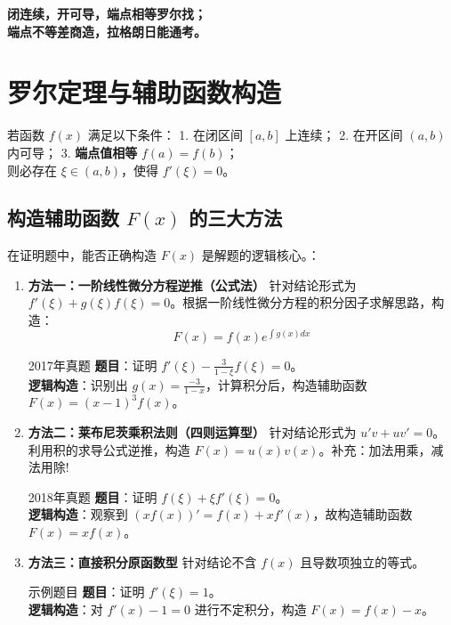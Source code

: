 \documentclass[UTF8]{ctexart}
\begin{document}
\begin{tcolorbox}[colback=yellow!10, colframe=orange!80!black, title=【冲刺口诀】]
\textbf{闭连续，开可导，端点相等罗尔找；} \\
\textbf{端点不等差商造，拉格朗日能通考。}
\end{tcolorbox}

\section{罗尔定理与辅助函数构造}

\begin{conceptbox}[定理 1：罗尔定理]
若函数 $f(x)$ 满足以下条件：
1. 在闭区间 $[a, b]$ 上连续；
2. 在开区间 $(a, b)$ 内可导；
3. \textbf{端点值相等} $f(a)=f(b)$；\\
则必存在 $\xi \in (a, b)$，使得 $f'(\xi)=0$。
\end{conceptbox}

\subsection{构造辅助函数 $F(x)$ 的三大方法}
在证明题中，能否正确构造 $F(x)$ 是解题的逻辑核心。：

\begin{enumerate}
    \item \textbf{方法一：一阶线性微分方程逆推（公式法）}
    针对结论形式为 $f'(\xi) + g(\xi)f(\xi) = 0$。根据一阶线性微分方程的积分因子求解思路，构造：
    $$F(x) = f(x) e^{\int g(x) dx}$$
    
    \begin{examnote}{2017年真题}
    \textbf{题目}：证明 $f'(\xi) - \frac{3}{1-\xi}f(\xi) = 0$。\\
    \textbf{逻辑构造}：识别出 $g(x) = \frac{-3}{1-x}$，计算积分后，构造辅助函数 $F(x) = (x-1)^3 f(x)$。
    \end{examnote}

    \item \textbf{方法二：莱布尼茨乘积法则（四则运算型）}
    针对结论形式为 $u' v + u v' = 0$。利用积的求导公式逆推，构造 $F(x) = u(x)v(x)$。补充：加法用乘，减法用除!
    
    \begin{examnote}{2018年真题}
    \textbf{题目}：证明 $f(\xi) + \xi f'(\xi) = 0$。\\
    \textbf{逻辑构造}：观察到 $(xf(x))' = f(x) + xf'(x)$，故构造辅助函数 $F(x) = xf(x)$。
    \end{examnote}

    \item \textbf{方法三：直接积分原函数型}
    针对结论不含 $f(x)$ 且导数项独立的等式。
    
    \begin{examnote}{示例题目}
    \textbf{题目}：证明 $f'(\xi) = 1$。\\
    \textbf{逻辑构造}：对 $f'(x)-1=0$ 进行不定积分，构造 $F(x) = f(x) - x$。
    \end{examnote}
\end{enumerate}
\end{document}

